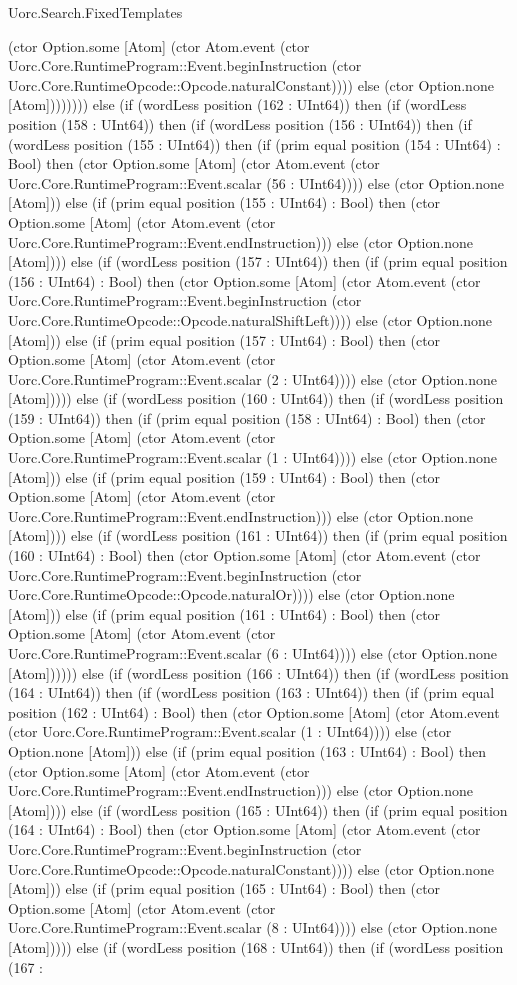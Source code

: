 \begin{lexlean}{Uorc.Search.FixedTemplates}
\begin{semanticmodule}
{(ctor Option.some [Atom] (ctor Atom.event (ctor Uorc.Core.RuntimeProgram::Event.beginInstruction (ctor Uorc.Core.RuntimeOpcode::Opcode.naturalConstant)))) else (ctor Option.none [Atom]))))))) else (if (wordLess position (162 : UInt64)) then (if (wordLess position (158 : UInt64)) then (if (wordLess position (156 : UInt64)) then (if (wordLess position (155 : UInt64)) then (if (prim equal position (154 : UInt64) : Bool) then (ctor Option.some [Atom] (ctor Atom.event (ctor Uorc.Core.RuntimeProgram::Event.scalar (56 : UInt64)))) else (ctor Option.none [Atom])) else (if (prim equal position (155 : UInt64) : Bool) then (ctor Option.some [Atom] (ctor Atom.event (ctor Uorc.Core.RuntimeProgram::Event.endInstruction))) else (ctor Option.none [Atom]))) else (if (wordLess position (157 : UInt64)) then (if (prim equal position (156 : UInt64) : Bool) then (ctor Option.some [Atom] (ctor Atom.event (ctor Uorc.Core.RuntimeProgram::Event.beginInstruction (ctor Uorc.Core.RuntimeOpcode::Opcode.naturalShiftLeft)))) else (ctor Option.none [Atom])) else (if (prim equal position (157 : UInt64) : Bool) then (ctor Option.some [Atom] (ctor Atom.event (ctor Uorc.Core.RuntimeProgram::Event.scalar (2 : UInt64)))) else (ctor Option.none [Atom])))) else (if (wordLess position (160 : UInt64)) then (if (wordLess position (159 : UInt64)) then (if (prim equal position (158 : UInt64) : Bool) then (ctor Option.some [Atom] (ctor Atom.event (ctor Uorc.Core.RuntimeProgram::Event.scalar (1 : UInt64)))) else (ctor Option.none [Atom])) else (if (prim equal position (159 : UInt64) : Bool) then (ctor Option.some [Atom] (ctor Atom.event (ctor Uorc.Core.RuntimeProgram::Event.endInstruction))) else (ctor Option.none [Atom]))) else (if (wordLess position (161 : UInt64)) then (if (prim equal position (160 : UInt64) : Bool) then (ctor Option.some [Atom] (ctor Atom.event (ctor Uorc.Core.RuntimeProgram::Event.beginInstruction (ctor Uorc.Core.RuntimeOpcode::Opcode.naturalOr)))) else (ctor Option.none [Atom])) else (if (prim equal position (161 : UInt64) : Bool) then (ctor Option.some [Atom] (ctor Atom.event (ctor Uorc.Core.RuntimeProgram::Event.scalar (6 : UInt64)))) else (ctor Option.none [Atom]))))) else (if (wordLess position (166 : UInt64)) then (if (wordLess position (164 : UInt64)) then (if (wordLess position (163 : UInt64)) then (if (prim equal position (162 : UInt64) : Bool) then (ctor Option.some [Atom] (ctor Atom.event (ctor Uorc.Core.RuntimeProgram::Event.scalar (1 : UInt64)))) else (ctor Option.none [Atom])) else (if (prim equal position (163 : UInt64) : Bool) then (ctor Option.some [Atom] (ctor Atom.event (ctor Uorc.Core.RuntimeProgram::Event.endInstruction))) else (ctor Option.none [Atom]))) else (if (wordLess position (165 : UInt64)) then (if (prim equal position (164 : UInt64) : Bool) then (ctor Option.some [Atom] (ctor Atom.event (ctor Uorc.Core.RuntimeProgram::Event.beginInstruction (ctor Uorc.Core.RuntimeOpcode::Opcode.naturalConstant)))) else (ctor Option.none [Atom])) else (if (prim equal position (165 : UInt64) : Bool) then (ctor Option.some [Atom] (ctor Atom.event (ctor Uorc.Core.RuntimeProgram::Event.scalar (8 : UInt64)))) else (ctor Option.none [Atom])))) else (if (wordLess position (168 : UInt64)) then (if (wordLess position (167 : }
\end{semanticmodule}
\end{lexlean}
